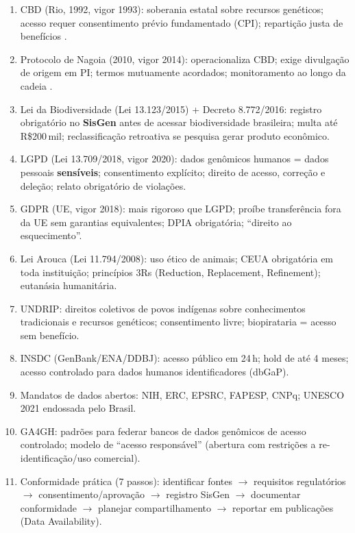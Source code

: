 \clearpage
\begin{revise}\small
\begin{enumerate}[itemsep=0pt, topsep=0pt, parsep=0pt]
    \item CBD (Rio, 1992, vigor 1993): soberania estatal sobre recursos genéticos; acesso requer consentimento prévio fundamentado (CPI); repartição justa de benefícios \parencite{cbd1992}.
    \item Protocolo de Nagoia (2010, vigor 2014): operacionaliza CBD; exige divulgação de origem em PI; termos mutuamente acordados; monitoramento ao longo da cadeia \parencite{nagoyaprotocol2014}.
    \item Lei da Biodiversidade (Lei 13.123/2015) + Decreto 8.772/2016: registro obrigatório no \textbf{SisGen} antes de acessar biodiversidade brasileira; multa até R\$200\,mil; reclassificação retroativa se pesquisa gerar produto econômico.
    \item LGPD (Lei 13.709/2018, vigor 2020): dados genômicos humanos = dados pessoais \textbf{sensíveis}; consentimento explícito; direito de acesso, correção e deleção; relato obrigatório de violações.
    \item GDPR (UE, vigor 2018): mais rigoroso que LGPD; proíbe transferência fora da UE sem garantias equivalentes; DPIA obrigatória; ``direito ao esquecimento''.
    \item Lei Arouca (Lei 11.794/2008): uso ético de animais; CEUA obrigatória em toda instituição; princípios 3Rs (Reduction, Replacement, Refinement); eutanásia humanitária.
    \item UNDRIP: direitos coletivos de povos indígenas sobre conhecimentos tradicionais e recursos genéticos; consentimento livre; biopirataria = acesso sem benefício.
    \item INSDC (GenBank/ENA/DDBJ): acesso público em 24\,h; hold de até 4 meses; acesso controlado para dados humanos identificadores (dbGaP).
    \item Mandatos de dados abertos: NIH, ERC, EPSRC, FAPESP, CNPq; UNESCO 2021 endossada pelo Brasil.
    \item GA4GH: padrões para federar bancos de dados genômicos de acesso controlado; modelo de ``acesso responsável'' (abertura com restrições a re-identificação/uso comercial).
    \item Conformidade prática (7 passos): identificar fontes $\to$ requisitos regulatórios $\to$ consentimento/aprovação $\to$ registro SisGen $\to$ documentar conformidade $\to$ planejar compartilhamento $\to$ reportar em publicações (Data Availability).
\end{enumerate}
\end{revise}

\clearpage

\printbibliography[heading=subbibliography,title={Referências}]


